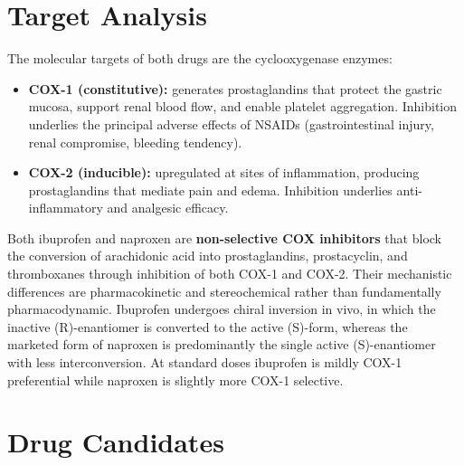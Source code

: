 \documentclass[11pt]{article}
\begin{document}
\section{Target Analysis}
The molecular targets of both drugs are the cyclooxygenase enzymes:

\begin{itemize}[leftmargin=1.4em]
\item \textbf{COX-1 (constitutive):} generates prostaglandins that protect the gastric mucosa, support renal blood flow, and enable platelet aggregation. Inhibition underlies the principal adverse effects of NSAIDs (gastrointestinal injury, renal compromise, bleeding tendency).
\item \textbf{COX-2 (inducible):} upregulated at sites of inflammation, producing prostaglandins that mediate pain and edema. Inhibition underlies anti-inflammatory and analgesic efficacy.
\end{itemize}

Both ibuprofen and naproxen are \textbf{non-selective COX inhibitors} that block the conversion of arachidonic acid into prostaglandins, prostacyclin, and thromboxanes through inhibition of both COX-1 and COX-2. Their mechanistic differences are pharmacokinetic and stereochemical rather than fundamentally pharmacodynamic. Ibuprofen undergoes chiral inversion in vivo, in which the inactive (R)-enantiomer is converted to the active (S)-form, whereas the marketed form of naproxen is predominantly the single active (S)-enantiomer with less interconversion. At standard doses ibuprofen is mildly COX-1 preferential while naproxen is slightly more COX-1 selective.

\section{Drug Candidates}
\end{document}
